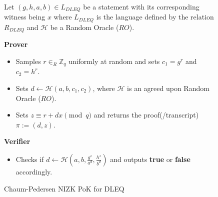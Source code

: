\begin{figure}[ht]
    \centering
    \begin{tcolorbox}[title=\textbf{Chaum-Pedersen Protocol for DLEQ}, width=0.9\textwidth, colframe=blue!75!black, colback=blue!10, sharp corners]
        Let $(g,h,a,b)\in L_{DLEQ}$ be a statement with its corresponding witness being $x$ where $L_{DLEQ}$
        is the language defined by the relation $R_{DLEQ}$ and $\mathcal{H}$ be a Random Oracle ($RO$).
        
        \vspace{0.5em}
        \textbf{Prover}
        \begin{itemize}
            \item Samples $r\in_{R}\mathbb{Z}_q$ uniformly at random and sets 
                $c_1=g^r$ and $c_2=h^r$.
            \item Sets $d\leftarrow \mathcal{H}(a,b,c_1,c_2)$, where $\mathcal{H}$ is 
                an agreed upon Random Oracle ($RO$).
            \item Sets $z\equiv r+dx \pmod{q}$ and returns the proof(/transcript) $\pi:= (d,z)$.
        \end{itemize}
        
        \vspace{0.5em}
        \textbf{Verifier}
        \begin{itemize}
            \item Checks if $d\leftarrow \mathcal{H}(a,b,\frac{g^z}{a^d},\frac{h^z}{b^d})$ 
                and outputs \textbf{true} or \textbf{false} accordingly.
        \end{itemize}
    \end{tcolorbox}
    \caption{Chaum-Pedersen NIZK PoK for DLEQ}
    \label{fig:chaum-pedersen}
\end{figure}
